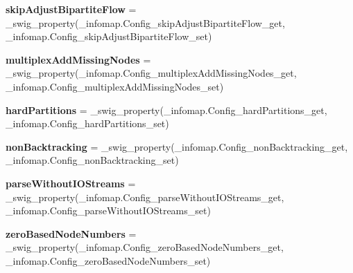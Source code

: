 \begin{DoxyCompactItemize}
\item 
\mbox{\label{classdsmacc_1_1graph_1_1infomap_1_1infomap_1_1Config_aaafaf914fcb81c6a1d1da2d63027be94}} 
{\bfseries skip\+Adjust\+Bipartite\+Flow} = \+\_\+swig\+\_\+property(\+\_\+infomap.\+Config\+\_\+skip\+Adjust\+Bipartite\+Flow\+\_\+get, \+\_\+infomap.\+Config\+\_\+skip\+Adjust\+Bipartite\+Flow\+\_\+set)
\item 
\mbox{\label{classdsmacc_1_1graph_1_1infomap_1_1infomap_1_1Config_aacb0079951ec0c9cd2b5ff15b29f0ba7}} 
{\bfseries multiplex\+Add\+Missing\+Nodes} = \+\_\+swig\+\_\+property(\+\_\+infomap.\+Config\+\_\+multiplex\+Add\+Missing\+Nodes\+\_\+get, \+\_\+infomap.\+Config\+\_\+multiplex\+Add\+Missing\+Nodes\+\_\+set)
\item 
\mbox{\label{classdsmacc_1_1graph_1_1infomap_1_1infomap_1_1Config_ae158f5889670894e5d48a8d4b8b1afda}} 
{\bfseries hard\+Partitions} = \+\_\+swig\+\_\+property(\+\_\+infomap.\+Config\+\_\+hard\+Partitions\+\_\+get, \+\_\+infomap.\+Config\+\_\+hard\+Partitions\+\_\+set)
\item 
\mbox{\label{classdsmacc_1_1graph_1_1infomap_1_1infomap_1_1Config_a26b082fed80fe075352de0dd10148662}} 
{\bfseries non\+Backtracking} = \+\_\+swig\+\_\+property(\+\_\+infomap.\+Config\+\_\+non\+Backtracking\+\_\+get, \+\_\+infomap.\+Config\+\_\+non\+Backtracking\+\_\+set)
\item 
\mbox{\label{classdsmacc_1_1graph_1_1infomap_1_1infomap_1_1Config_a8de7b9ac9a863f0f6f4d0a2e304e203a}} 
{\bfseries parse\+Without\+I\+O\+Streams} = \+\_\+swig\+\_\+property(\+\_\+infomap.\+Config\+\_\+parse\+Without\+I\+O\+Streams\+\_\+get, \+\_\+infomap.\+Config\+\_\+parse\+Without\+I\+O\+Streams\+\_\+set)
\item 
\mbox{\label{classdsmacc_1_1graph_1_1infomap_1_1infomap_1_1Config_ad8b03d21e722634f7cf953ac20419dbe}} 
{\bfseries zero\+Based\+Node\+Numbers} = \+\_\+swig\+\_\+property(\+\_\+infomap.\+Config\+\_\+zero\+Based\+Node\+Numbers\+\_\+get, \+\_\+infomap.\+Config\+\_\+zero\+Based\+Node\+Numbers\+\_\+set)

\end{DoxyCompactItemize}
